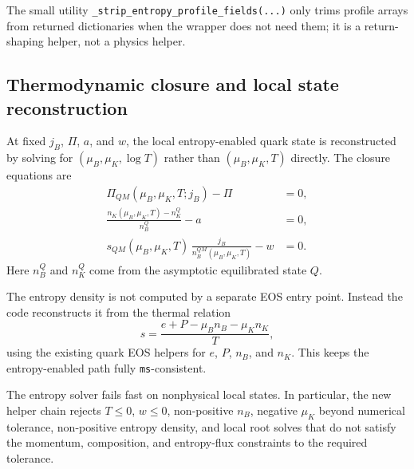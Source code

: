 \documentclass[11pt]{article}
\begin{document}
The small utility \texttt{\_strip\_entropy\_profile\_fields(...)} only trims
profile arrays from returned dictionaries when the wrapper does not need them;
it is a return-shaping helper, not a physics helper.

\subsection{Thermodynamic closure and local state reconstruction}
At fixed $j_B$, $\Pi$, $a$, and $w$, the local entropy-enabled quark state is
reconstructed by solving for $(\mu_B,\mu_K,\log T)$ rather than
$(\mu_B,\mu_K,T)$ directly. The closure equations are
\begin{align}
\Pi_{QM}(\mu_B,\mu_K,T;j_B)-\Pi &= 0,\\
\frac{n_K(\mu_B,\mu_K,T)-n_K^Q}{n_B^Q}-a &= 0,\\
s_{QM}(\mu_B,\mu_K,T)\,\frac{j_B}{n_B^{QM}(\mu_B,\mu_K,T)}-w &= 0.
\end{align}
Here $n_B^Q$ and $n_K^Q$ come from the asymptotic equilibrated state $Q$.

The entropy density is not computed by a separate EOS entry point. Instead the
code reconstructs it from the thermal relation
\begin{equation}
s=\frac{e+P-\mu_B n_B-\mu_K n_K}{T},
\end{equation}
using the existing quark EOS helpers for $e$, $P$, $n_B$, and $n_K$.
This keeps the entropy-enabled path fully \texttt{ms}-consistent.

The entropy solver fails fast on nonphysical local states. In particular, the
new helper chain rejects $T\le 0$, $w\le 0$, non-positive $n_B$, negative
$\mu_K$ beyond numerical tolerance, non-positive entropy density, and local
root solves that do not satisfy the momentum, composition, and entropy-flux
constraints to the required tolerance.
\end{document}
